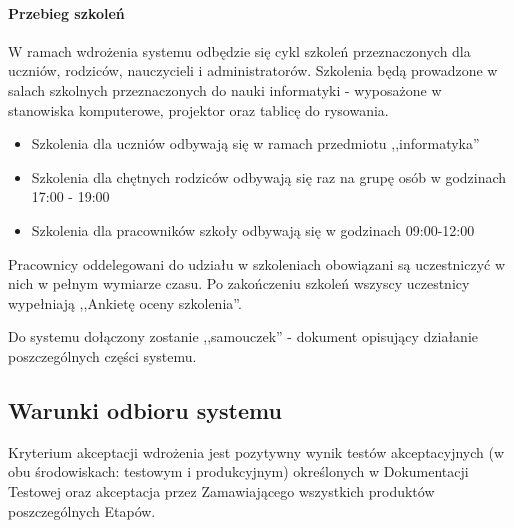 \documentclass{article}
\begin{document}
\paragraph{Przebieg szkoleń}
W ramach wdrożenia systemu odbędzie się cykl szkoleń przeznaczonych dla uczniów, rodziców, nauczycieli i administratorów. Szkolenia będą prowadzone w salach szkolnych przeznaczonych do nauki informatyki - wyposażone w stanowiska komputerowe, projektor oraz tablicę do rysowania.
\begin{itemize}
\item Szkolenia dla uczniów odbywają się w ramach przedmiotu ,,informatyka''
\item Szkolenia dla chętnych rodziców odbywają się raz na grupę osób w godzinach 17:00 - 19:00
\item Szkolenia dla pracowników szkoły odbywają się w godzinach 09:00-12:00
\end{itemize}
Pracownicy oddelegowani do udziału w szkoleniach obowiązani są uczestniczyć w nich w pełnym wymiarze czasu. Po zakończeniu szkoleń wszyscy uczestnicy wypełniają ,,Ankietę oceny szkolenia''.

Do systemu dołączony zostanie ,,samouczek'' - dokument opisujący działanie poszczególnych części systemu.

\subsection{Warunki odbioru systemu}
Kryterium akceptacji wdrożenia jest pozytywny wynik testów akceptacyjnych (w obu środowiskach: testowym i produkcyjnym) określonych w Dokumentacji Testowej oraz akceptacja przez Zamawiającego wszystkich produktów poszczególnych Etapów. 
\end{document}
